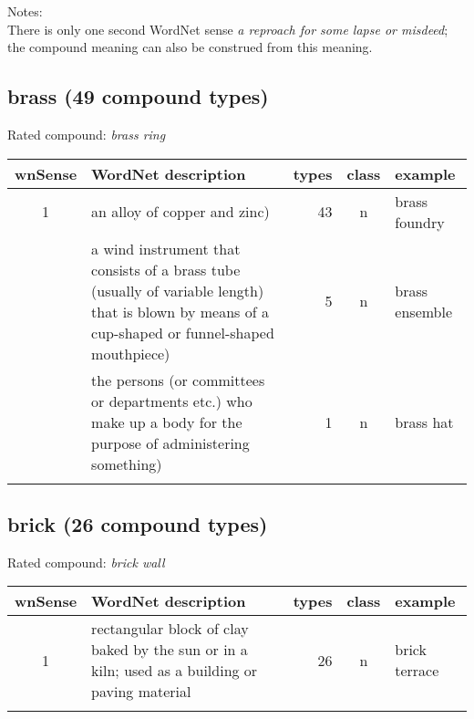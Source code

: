\noindent
Notes:\\\enlargethispage{1\baselineskip}There is only one second WordNet sense \emph{a reproach for some
  lapse or misdeed}; the compound meaning can also be construed from this meaning.

\subsection{brass (49 compound types)}
Rated compound: \emph{brass ring}

\vspace*{1ex}

\noindent
\begin{longtable}{c>{\raggedright\arraybackslash}p{5cm}rc>{\raggedright\arraybackslash}p{2cm}}\lsptoprule
{\small wnSense}&WordNet description&types&class&example\\\midrule
1&an alloy of copper and zinc)&43&n&brass foundry\\\tablevspace
2&a wind instrument that consists of a brass tube (usually of variable length) that is blown by means of a cup-shaped or funnel-shaped mouthpiece)&5&n&brass ensemble\\\tablevspace
3&the persons (or committees or departments etc.) who make up a body for the purpose of administering something)&1&n&brass hat\\\lspbottomrule
\end{longtable}


\subsection{brick (26 compound types)}
Rated compound: \emph{brick wall}

\vspace*{1ex}

\noindent
\begin{longtable}{c>{\raggedright\arraybackslash}p{5cm}rc>{\raggedright\arraybackslash}p{2cm}}\lsptoprule
{\small wnSense}&WordNet description&types&class&example\\\midrule
1&rectangular block of clay baked by the sun or in a kiln; used as a building or paving material&26&n&brick terrace\\\lspbottomrule
\end{longtable}

